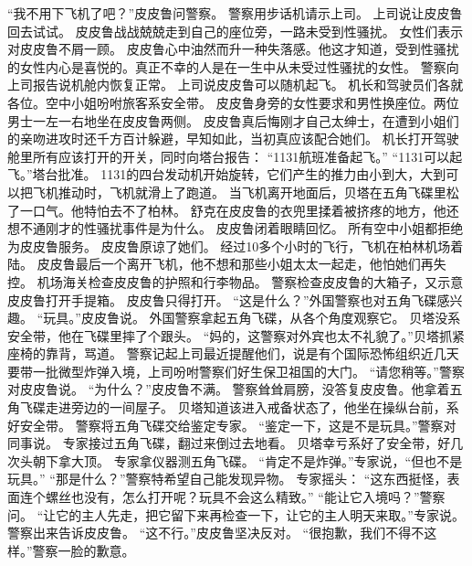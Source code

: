 \documentclass[a4paper,12pt,UTF8,twoside]{ctexbook}
\begin{document}
        “我不用下飞机了吧？”皮皮鲁问警察。 
        警察用步话机请示上司。 
        上司说让皮皮鲁回去试试。 
        皮皮鲁战战兢兢走到自己的座位旁，一路未受到性骚扰。 
        女性们表示对皮皮鲁不屑一顾。 
        皮皮鲁心中油然而升一种失落感。他这才知道，受到性骚扰的女性内心是喜悦的。真正不幸的人是在一生中从未受过性骚扰的女性。 
        警察向上司报告说机舱内恢复正常。 
        上司说皮皮鲁可以随机起飞。 
        机长和驾驶员们各就各位。空中小姐吩咐旅客系安全带。 
        皮皮鲁身旁的女性要求和男性换座位。两位男士一左一右地坐在皮皮鲁两侧。 
        皮皮鲁真后悔刚才自己太绅士，在遭到小姐们的亲吻进攻时还千方百计躲避，早知如此，当初真应该配合她们。 
        机长打开驾驶舱里所有应该打开的开关，同时向塔台报告： 
        “1131航班准备起飞。” 
        “1131可以起飞。”塔台批准。 
        1131的四台发动机开始旋转，它们产生的推力由小到大，大到可以把飞机推动时，飞机就滑上了跑道。 
        当飞机离开地面后，贝塔在五角飞碟里松了一口气。他特怕去不了柏林。 
        舒克在皮皮鲁的衣兜里揉着被挤疼的地方，他还想不通刚才的性骚扰事件是为什么。 
        皮皮鲁闭着眼睛回忆。 
        所有空中小姐都拒绝为皮皮鲁服务。 
        皮皮鲁原谅了她们。 
        经过10多个小时的飞行，飞机在柏林机场着陆。 
        皮皮鲁最后一个离开飞机，他不想和那些小姐太太一起走，他怕她们再失控。 
        机场海关检查皮皮鲁的护照和行李物品。 
        警察检查皮皮鲁的大箱子，又示意皮皮鲁打开手提箱。 
         皮皮鲁只得打开。 
        “这是什么？”外国警察也对五角飞碟感兴趣。 
        “玩具。”皮皮鲁说。 
        外国警察拿起五角飞碟，从各个角度观察它。 
        贝塔没系安全带，他在飞碟里摔了个跟头。 
        “妈的，这警察对外宾也太不礼貌了。”贝塔抓紧座椅的靠背，骂道。 
        警察记起上司最近提醒他们，说是有个国际恐怖组织近几天要带一批微型炸弹入境，上司吩咐警察们好生保卫祖国的大门。 
        “请您稍等。”警察对皮皮鲁说。 
        “为什么？”皮皮鲁不满。 
        警察耸耸肩膀，没答复皮皮鲁。他拿着五角飞碟走进旁边的一间屋子。 
        贝塔知道该进入戒备状态了，他坐在操纵台前，系好安全带。 
        警察将五角飞碟交给鉴定专家。 
        “鉴定一下，这是不是玩具。”警察对同事说。 
        专家接过五角飞碟，翻过来倒过去地看。 
        贝塔幸亏系好了安全带，好几次头朝下拿大顶。 
        专家拿仪器测五角飞碟。 
        “肯定不是炸弹。”专家说，“但也不是玩具。” 
        “那是什么？”警察特希望自己能发现异物。 
        专家摇头： 
        “这东西挺怪，表面连个螺丝也没有，怎么打开呢？玩具不会这么精致。” 
        “能让它入境吗？”警察问。 
        “让它的主人先走，把它留下来再检查一下，让它的主人明天来取。”专家说。 
        警察出来告诉皮皮鲁。 
        “这不行。”皮皮鲁坚决反对。 
        “很抱歉，我们不得不这样。”警察一脸的歉意。 
\end{document}
